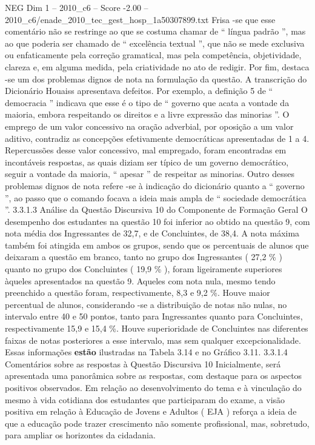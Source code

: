 \begin{textsample}{NEG Dim 1 – 2010\_c6 – Score -2.00 – 2010\_c6/enade\_2010\_tec\_gest\_hosp\_1a50307899.txt}
Frisa -se que esse comentário não se restringe ao que se costuma chamar de “ língua padrão ”, mas ao que poderia ser chamado de “ excelência textual ”, que não se mede exclusiva ou enfaticamente pela correção gramatical, mas pela competência, objetividade, clareza e, em alguma medida, pela criatividade no ato de redigir.
Por fim, destaca -se um dos problemas dignos de nota na formulação da questão.
A transcrição do Dicionário Houaiss apresentava defeitos.
Por exemplo, a definição 5 de “ democracia ” indicava que esse é o tipo de “ governo que acata a vontade da maioria, embora respeitando os direitos e a livre expressão das minorias ”.
O emprego de um valor concessivo na oração adverbial, por oposição a um valor aditivo, contradiz as concepções efetivamente democráticas apresentadas de 1 a 4.
Repercussões desse valor concessivo, mal empregado, foram encontradas em incontáveis respostas, as quais diziam ser típico de um governo democrático, seguir a vontade da maioria, “ apesar ” de respeitar as minorias.
Outro desses problemas dignos de nota refere -se à indicação do dicionário quanto a “ governo ”, ao passo que o comando focava a ideia mais ampla de “ sociedade democrática ”. 3.3.1.3 Análise da Questão Discursiva 10 do Componente de Formação Geral O desempenho dos estudantes na questão 10 foi inferior ao obtido na questão 9, com nota média dos Ingressantes de 32,7, e de Concluintes, de 38,4.
A nota máxima também foi atingida em ambos os grupos, sendo que os percentuais de alunos que deixaram a questão em branco, tanto no grupo dos Ingressantes ( 27,2 \% ) quanto no grupo dos Concluintes ( 19,9 \% ), foram ligeiramente superiores àqueles apresentados na questão 9.
Aqueles com nota nula, mesmo tendo preenchido a questão foram, respectivamente, 8,3 e 9,2 \%.
Houve maior percentual de alunos, considerando -se a distribuição de notas não nulas, no intervalo entre 40 e 50 pontos, tanto para Ingressantes quanto para Concluintes, respectivamente 15,9 e 15,4 \%.
Houve superioridade de Concluintes nas diferentes faixas de notas posteriores a esse intervalo, mas sem qualquer excepcionalidade.
Essas informações \textbf{estão} ilustradas na Tabela 3.14 e no Gráfico 3.11. 3.3.1.4 Comentários sobre as respostas à Questão Discursiva 10 Inicialmente, será apresentada uma panorâmica sobre as respostas, com destaque para os aspectos positivos observados.
Em relação ao desenvolvimento do tema e à vinculação do mesmo à vida cotidiana dos estudantes que participaram do exame, a visão positiva em relação à Educação de Jovens e Adultos ( EJA ) reforça a ideia de que a educação pode trazer crescimento não somente profissional, mas, sobretudo, para ampliar os horizontes da cidadania.

\end{textsample}
